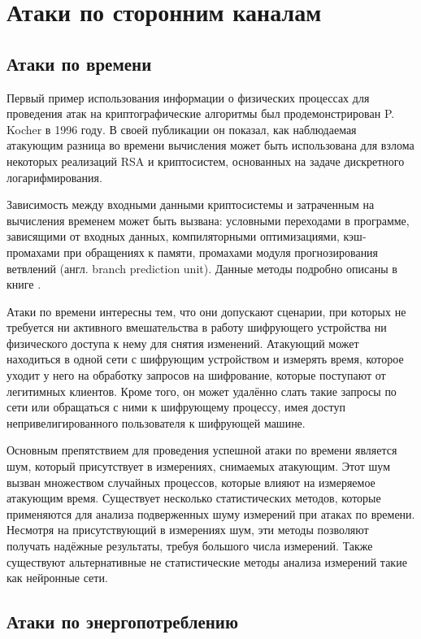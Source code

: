 \section{Атаки по сторонним каналам} \label{sec:sca}
\clearpage

\subsection{Атаки по времени}

Первый пример использования информации о физических процессах для проведения
атак на криптографические алгоритмы был продемонстрирован P. Kocher в 1996 году.
В своей публикации \cite{kocher} он показал, как наблюдаемая атакующим разница
во времени вычисления может быть использована для взлома некоторых реализаций
RSA и криптосистем, основанных на задаче дискретного логарифмирования.

Зависимость между входными данными криптосистемы и затраченным на вычисления
временем может быть вызвана: условными переходами в программе, зависящими от
входных данных, компиляторными оптимизациями, кэш-промахами при обращениях к
памяти, промахами модуля прогнозирования ветвлений (англ. branch prediction
unit). Данные методы подробно описаны в книге \cite{cren}.

Атаки по времени интересны тем, что они допускают сценарии, при которых
не требуется ни активного вмешательства в работу шифрующего устройства ни
физического доступа к нему для снятия изменений. Атакующий может находиться в
одной сети с шифрующим устройством и измерять время, которое уходит у него на
обработку запросов на шифрование, которые поступают от легитимных клиентов.
Кроме того, он может удалённо слать такие запросы по сети или обращаться с ними
к шифрующему процессу, имея доступ непривелигированного пользователя к шифрующей
машине.

Основным препятствием для проведения успешной атаки по времени является шум,
который присутствует в измерениях, снимаемых атакующим. Этот шум вызван
множеством случайных процессов, которые влияют на измеряемое атакующим время.
Существует несколько статистических методов, которые применяются для анализа
подверженных шуму измерений при атаках по времени. Несмотря на присутствующий
в измерениях шум, эти методы позволяют получать надёжные результаты, требуя
большого числа измерений. Также существуют альтернативные не статистические
методы анализа измерений такие как нейронные сети.

\clearpage

\subsection{Атаки по энергопотреблению}
\clearpage

